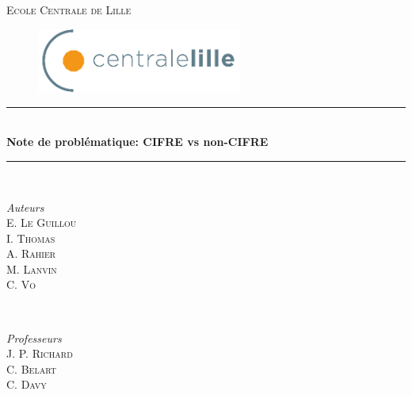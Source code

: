 \documentclass[12pt]{article}
\begin{document}
\begin{titlepage} %
	\newcommand{\HRule}{\rule{\linewidth}{0.5mm}} %
	
	\center %
	
	
	\textsc{\LARGE Ecole Centrale de Lille}\\[1cm] %
	
	
    \begin{figure}[h!]
        \centering
        \includegraphics[width=0.6\textwidth]{logo_centrale.png}
        \label{LogoCentrale}
    \end{figure}
    
    \vfill
	
	
	\HRule\\[0.4cm]
	
	{\huge\bfseries Note de problématique: CIFRE vs non-CIFRE}\\[0.4cm] %
	
	\HRule\\[1.0cm]
	

	\begin{minipage}{0.4\textwidth}
		\begin{flushleft}
			\large
			\textit{Auteurs}\\
			E. \textsc{Le Guillou} \\
			I. \textsc{Thomas}\\
			A. \textsc{Rahier}\\
			M. \textsc{Lanvin}\\
			C. \textsc{Vo}
		\end{flushleft}
	\end{minipage}
	~
	\begin{minipage}{0.4\textwidth}
		\begin{flushright}
			\large
			\textit{Professeurs}\\
			J. P. \textsc{Richard}\\ %
			C. \textsc{Belart} \\
			C. \textsc{Davy}
		\end{flushright}
	\end{minipage}


\end{titlepage}
\end{document}

